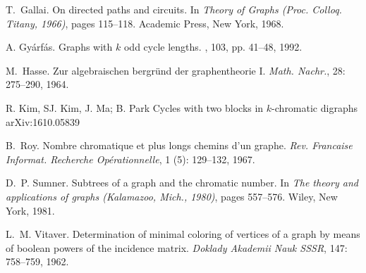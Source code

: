\documentclass[utf8,10pt]{article}
\theoremstyle{plain}
\theoremstyle{definition}
\theoremstyle{remark}
\begin{document}
\begin{thebibliography}{XX}
T.~Gallai.
\newblock On directed paths and circuits.
\newblock In \emph{Theory of Graphs (Proc. Colloq. Titany, 1966)}, pages
  115--118. Academic Press, New York, 1968.

A. Gy\'arf\'as.
\newblock Graphs with $k$ odd cycle lengths.
, 103, pp. 41--48, 1992.


M.~Hasse.
\newblock Zur algebraischen bergr\"und der graphentheorie {I}.
\newblock \emph{Math. Nachr.}, 28: 275--290, 1964.


R. Kim, SJ. Kim, J. Ma; B. Park
\newblock Cycles with two blocks in $k$-chromatic digraphs
\newblock arXiv:1610.05839



B.~Roy.
\newblock Nombre chromatique et plus longs chemins d'un graphe.
\newblock \emph{Rev. Francaise Informat. Recherche Op\'erationnelle},
  1 (5): 129--132, 1967.


D.~P. Sumner.
\newblock Subtrees of a graph and the chromatic number.
\newblock In {\em The theory and applications of graphs (Kalamazoo, Mich.,
  1980)}, pages 557--576. Wiley, New York, 1981.

L.~M. Vitaver.
\newblock Determination of minimal coloring of vertices of a graph by means of
  boolean powers of the incidence matrix.
\newblock \emph{Doklady Akademii Nauk SSSR}, 147: 758--759, 1962.




\end{thebibliography}
\end{document}
